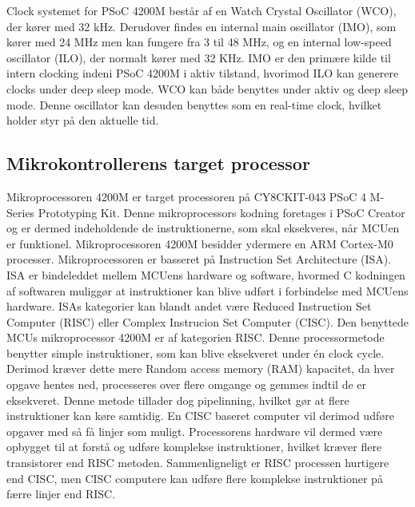 Clock systemet for PSoC 4200M består af en Watch Crystal Oscillator (WCO), der kører med 32 kHz. Derudover findes en internal main oscillator (IMO), som kører med 24 MHz men kan fungere fra 3 til 48 MHz, og en internal low-speed oscillator (ILO), der normalt kører med 32 KHz. IMO er den primære kilde til intern clocking indeni PSoC 4200M i aktiv tilstand, hvorimod ILO kan generere clocks under deep sleep mode. WCO kan både benyttes under aktiv og deep sleep mode. Denne oscillator kan desuden benyttes som en real-time clock, hvilket holder styr på den aktuelle tid. \citep{Semiconductor20164200M}

\subsection{Mikrokontrollerens target processor}
Mikroprocessoren 4200M er target processoren på CY8CKIT-043 PSoC 4 M-Series Prototyping Kit. Denne mikroprocessors kodning foretages i PSoC Creator og er dermed indeholdende de instruktionerne, som skal eksekveres, når MCUen er funktionel. Mikroprocessoren 4200M besidder ydermere en ARM Cortex-M0 processer. \newline
Mikroprocessoren er basseret på Instruction Set Architecture (ISA). ISA er bindeleddet mellem MCUens hardware og software, hvormed C kodningen af softwaren muliggør at instruktioner kan blive udført i forbindelse med MCUens hardware. ISAs kategorier kan blandt andet være Reduced Instruction Set Computer (RISC) eller Complex Instrucion Set Computer (CISC). \citep{CYPRESS2016Cortexm0,Semiconductor20164200M,Yadav2016} \newline
Den benyttede MCUs mikroprocessor 4200M er af kategorien RISC. Denne processormetode benytter simple instruktioner, som kan blive eksekveret under én clock cycle. Derimod kræver dette mere Random access memory (RAM) kapacitet, da hver opgave hentes ned, processeres over flere omgange og gemmes indtil de er eksekveret. Denne metode tillader dog pipelinning, hvilket gør at flere instruktioner kan køre samtidig. En CISC baseret computer vil derimod udføre opgaver med så få linjer som muligt. Processorens hardware vil dermed være opbygget til at forstå og udføre komplekse instruktioner, hvilket kræver flere transistorer end RISC metoden.  Sammenligneligt er RISC processen hurtigere end CISC, men CISC computere kan udføre flere komplekse instruktioner på færre linjer end RISC. \citep{CYPRESS2016Cortexm0,Semiconductor20164200M,Yadav2016}\\
